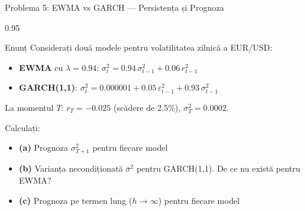 \documentclass[9pt, aspectratio=169, t]{beamer}
\begin{document}
\begin{frame}{Problema 5: EWMA vs GARCH --- Persistența și Prognoza}
    \begin{cminipage}{0.95\textwidth}
    \begin{block}{Enunț}
        Considerați două modele pentru volatilitatea zilnică a EUR/USD:
        \begin{itemize}\setlength{\itemsep}{0pt}
            \item \textbf{EWMA} cu $\lambda = 0.94$: \; $\sigma_t^2 = 0.94\, \sigma_{t-1}^2 + 0.06\, r_{t-1}^2$
            \item \textbf{GARCH(1,1)}: \; $\sigma_t^2 = 0.000001 + 0.05\, \varepsilon_{t-1}^2 + 0.93\, \sigma_{t-1}^2$
        \end{itemize}

        \vspace{0.3cm}
        La momentul $T$: $r_T = -0.025$ (scădere de 2.5\%), $\sigma_T^2 = 0.0002$.

        \vspace{0.3cm}
        Calculați:
        \begin{itemize}\setlength{\itemsep}{0pt}
            \item \textbf{(a)} Prognoza $\sigma_{T+1}^2$ pentru fiecare model
            \item \textbf{(b)} Varianța necondiționată $\bar{\sigma}^2$ pentru GARCH(1,1). De ce nu există pentru EWMA?
            \item \textbf{(c)} Prognoza pe termen lung ($h \to \infty$) pentru fiecare model
        \end{itemize}
    \end{block}
    \end{cminipage}
\end{frame}
\end{document}

